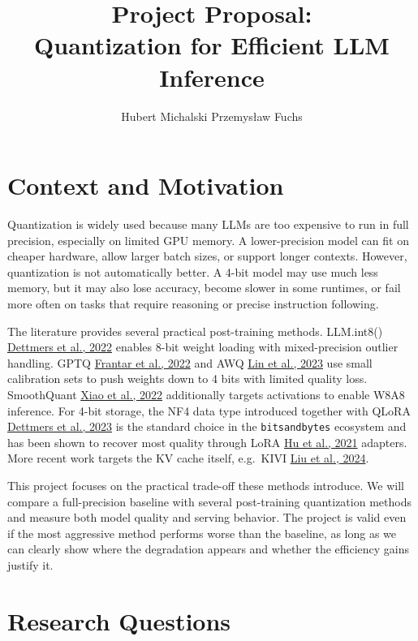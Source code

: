 \documentclass[11pt,a4paper]{article}
\title{\vspace{-2.5em}\textbf{Project Proposal:\\Quantization for Efficient LLM Inference}}
\author{Hubert Michalski \quad Przemysław Fuchs}
\date{}
\newcommand{\cit}[2]{\href{https://arxiv.org/abs/#2}{#1}}
\begin{document}
\maketitle

\section{Context and Motivation}

Quantization is widely used because many LLMs are too expensive to run in full precision, especially on limited GPU memory. A lower-precision model can fit on cheaper hardware, allow larger batch sizes, or support longer contexts. However, quantization is not automatically better. A 4-bit model may use much less memory, but it may also lose accuracy, become slower in some runtimes, or fail more often on tasks that require reasoning or precise instruction following.

The literature provides several practical post-training methods. LLM.int8() \cit{Dettmers et al., 2022}{2208.07339} enables 8-bit weight loading with mixed-precision outlier handling. GPTQ \cit{Frantar et al., 2022}{2210.17323} and AWQ \cit{Lin et al., 2023}{2306.00978} use small calibration sets to push weights down to 4 bits with limited quality loss. SmoothQuant \cit{Xiao et al., 2022}{2211.10438} additionally targets activations to enable W8A8 inference. For 4-bit storage, the NF4 data type introduced together with QLoRA \cit{Dettmers et al., 2023}{2305.14314} is the standard choice in the \texttt{bitsandbytes} ecosystem and has been shown to recover most quality through LoRA \cit{Hu et al., 2021}{2106.09685} adapters. More recent work targets the KV cache itself, e.g.\ KIVI \cit{Liu et al., 2024}{2402.02750}.

This project focuses on the practical trade-off these methods introduce. We will compare a full-precision baseline with several post-training quantization methods and measure both model quality and serving behavior. The project is valid even if the most aggressive method performs worse than the baseline, as long as we can clearly show where the degradation appears and whether the efficiency gains justify it.

\section{Research Questions}
\end{document}
